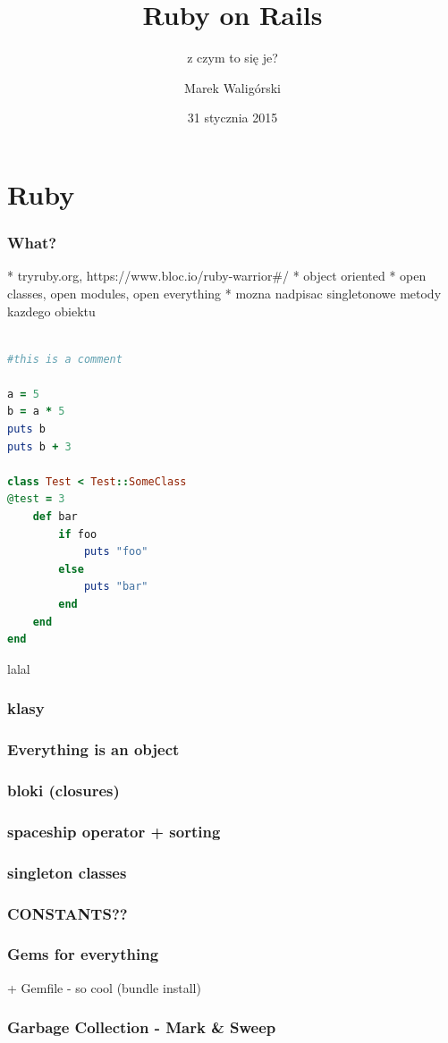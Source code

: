 \documentclass{beamer}
\title{Ruby on Rails}
\subtitle{z czym to się je?}
\author{Marek Waligórski}
\date{31 stycznia 2015}
\institute{InfoMEET Poznań}
\begin{document}
\begin{frame}[fragile]
\titlepage
\end{frame}

\section{Ruby}
\begin{frame}[fragile]\frametitle{What?}
  * tryruby.org, https://www.bloc.io/ruby-warrior#/
  * object oriented
  * open classes, open modules, open everything
  * mozna nadpisac singletonowe metody kazdego obiektu
\end{frame}

\begin{frame}[fragile]
\begin{lstlisting}[language=Ruby]

#this is a comment

a = 5
b = a * 5
puts b
puts b + 3

class Test < Test::SomeClass
@test = 3
    def bar
        if foo
            puts "foo"
        else
            puts "bar"
        end
    end
end
\end{lstlisting}
lalal
\end{frame}

\begin{frame}[fragile]
\frametitle{klasy}
\end{frame}
\begin{frame}[fragile]
\frametitle{Everything is an object}
\end{frame}
\begin{frame}[fragile]
\frametitle{bloki (closures)}
\end{frame}
\begin{frame}[fragile]
\frametitle{spaceship operator + sorting}
\end{frame}
\begin{frame}[fragile]
\frametitle{singleton classes}
\end{frame}
\begin{frame}[fragile]
\frametitle{CONSTANTS??}
\end{frame}
\begin{frame}[fragile]
\frametitle{Gems for everything}
 + Gemfile - so cool (bundle install)
\end{frame}
\begin{frame}[fragile]
\frametitle{Garbage Collection - Mark \& Sweep}
\end{frame}
\end{document}
